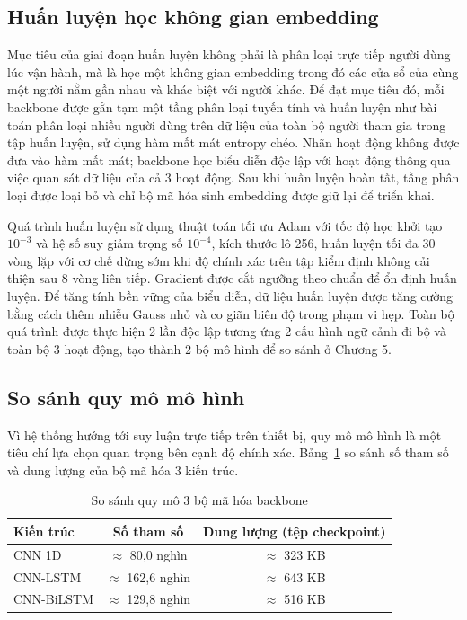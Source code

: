 \documentclass[../DoAn.tex]{subfiles}
\begin{document}
\subsection{Huấn luyện học không gian embedding}

Mục tiêu của giai đoạn huấn luyện không phải là phân loại trực tiếp người dùng lúc vận hành, mà là học một không gian embedding trong đó các cửa sổ của cùng một người nằm gần nhau và khác biệt với người khác. Để đạt mục tiêu đó, mỗi backbone được gắn tạm một tầng phân loại tuyến tính và huấn luyện như bài toán phân loại nhiều người dùng trên dữ liệu của toàn bộ người tham gia trong tập huấn luyện, sử dụng hàm mất mát entropy chéo. Nhãn hoạt động không được đưa vào hàm mất mát; backbone học biểu diễn độc lập với hoạt động thông qua việc quan sát dữ liệu của cả 3 hoạt động. Sau khi huấn luyện hoàn tất, tầng phân loại được loại bỏ và chỉ bộ mã hóa sinh embedding được giữ lại để triển khai.

Quá trình huấn luyện sử dụng thuật toán tối ưu Adam với tốc độ học khởi tạo $10^{-3}$ và hệ số suy giảm trọng số $10^{-4}$, kích thước lô 256, huấn luyện tối đa 30 vòng lặp với cơ chế dừng sớm khi độ chính xác trên tập kiểm định không cải thiện sau 8 vòng liên tiếp. Gradient được cắt ngưỡng theo chuẩn để ổn định huấn luyện. Để tăng tính bền vững của biểu diễn, dữ liệu huấn luyện được tăng cường bằng cách thêm nhiễu Gauss nhỏ và co giãn biên độ trong phạm vi hẹp. Toàn bộ quá trình được thực hiện 2 lần độc lập tương ứng 2 cấu hình ngữ cảnh đi bộ và toàn bộ 3 hoạt động, tạo thành 2 bộ mô hình để so sánh ở Chương 5.

\subsection{So sánh quy mô mô hình}

Vì hệ thống hướng tới suy luận trực tiếp trên thiết bị, quy mô mô hình là một tiêu chí lựa chọn quan trọng bên cạnh độ chính xác. Bảng~\ref{tab:model_size} so sánh số tham số và dung lượng của bộ mã hóa 3 kiến trúc.

\begin{table}[H]
    \centering
    \caption{So sánh quy mô 3 bộ mã hóa backbone}
    \label{tab:model_size}
    \begin{tabular}{|l|c|c|}
    \hline
    \textbf{Kiến trúc} & \textbf{Số tham số} & \textbf{Dung lượng (tệp checkpoint)} \\
    \hline
    CNN 1D     & $\approx$ 80,0 nghìn  & $\approx$ 323 KB \\
    \hline
    CNN-LSTM   & $\approx$ 162,6 nghìn & $\approx$ 643 KB \\
    \hline
    CNN-BiLSTM & $\approx$ 129,8 nghìn & $\approx$ 516 KB \\
    \hline
    \end{tabular}
\end{table}
\end{document}
